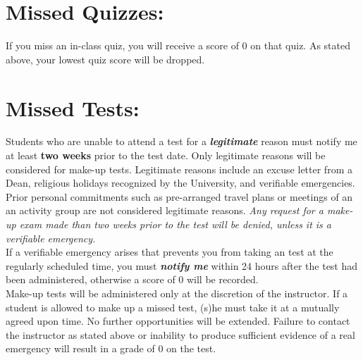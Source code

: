 \documentclass[11pt]{article}
\begin{document}
\vspace{0.5cm}


\section{\textbf{Missed Quizzes:}}
\vspace{-.65cm}
\hangindent=5cm 
If you miss an in-class quiz, you will receive a score of 0 on that quiz.  As stated above, your lowest quiz score will be dropped.


\vspace{0.5cm}


\section{\textbf{Missed Tests:}}
\vspace{-.65cm}
\hangindent=5cm 
Students who are unable to attend a test for a \textbf{\textit{legitimate}} reason must notify me at least \textbf{two weeks} prior to the test date.  Only legitimate reasons will be considered for make-up tests.  Legitimate reasons include an excuse letter from a Dean, religious holidays recognized by the University, and verifiable emergencies.  Prior personal commitments such as pre-arranged travel plans or meetings of an an activity group are not considered legitimate reasons.  \textit{Any request for a make-up exam made than two weeks prior to the test will be denied, unless it is a verifiable emergency.}\\

\hangindent=5cm 
If a verifiable emergency arises that prevents you from taking an test at the regularly scheduled time, you must \textbf{\textit{notify me}} within 24 hours after the test had been administered, otherwise a score of 0 will be recorded.\\

\hangindent=5cm 
Make-up tests will be administered only at the discretion of the instructor. If a student is allowed to make up a missed test, (s)he must take it at a mutually agreed upon time.  No further opportunities will be extended.  Failure to contact the instructor as stated above or inability to produce sufficient evidence of a real emergency will result in a grade of 0 on the test.

\vspace{0.5cm}
\end{document}
